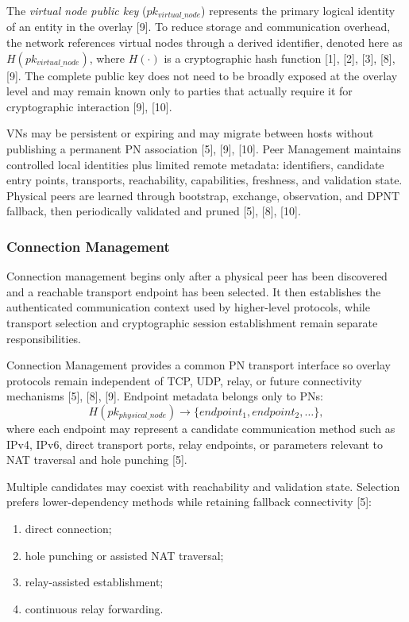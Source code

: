 \documentclass[12pt]{article}
\begin{document}
The \textit{virtual node public key} ($pk_{virtual\_node}$) represents the primary logical identity of an entity in the overlay [9]. To reduce storage and communication overhead, the network references virtual nodes through a derived identifier, denoted here as $H(pk_{virtual\_node})$, where $H(\cdot)$ is a cryptographic hash function [1], [2], [3], [8], [9]. The complete public key does not need to be broadly exposed at the overlay level and may remain known only to parties that actually require it for cryptographic interaction [9], [10].

VNs may be persistent or expiring and may migrate between hosts without publishing a permanent PN association [5], [9], [10]. Peer Management maintains controlled local identities plus limited remote metadata: identifiers, candidate entry points, transports, reachability, capabilities, freshness, and validation state. Physical peers are learned through bootstrap, exchange, observation, and DPNT fallback, then periodically validated and pruned [5], [8], [10].

\subsubsection{Connection Management}

Connection management begins only after a physical peer has been discovered and a reachable transport endpoint has been selected. It then establishes the authenticated communication context used by higher-level protocols, while transport selection and cryptographic session establishment remain separate responsibilities.

\thesisconnectiontikz

Connection Management provides a common PN transport interface so overlay protocols remain independent of TCP, UDP, relay, or future connectivity mechanisms [5], [8], [9]. Endpoint metadata belongs only to PNs:
\[
H(pk_{physical\_node}) \rightarrow \{endpoint_1, endpoint_2, \dots\},
\]
where each endpoint may represent a candidate communication method such as IPv4, IPv6, direct transport ports, relay endpoints, or parameters relevant to NAT traversal and hole punching [5].

Multiple candidates may coexist with reachability and validation state. Selection prefers lower-dependency methods while retaining fallback connectivity [5]:
\begin{enumerate}
    \item direct connection;
    \item hole punching or assisted NAT traversal;
    \item relay-assisted establishment;
    \item continuous relay forwarding.
\end{enumerate}
\end{document}

